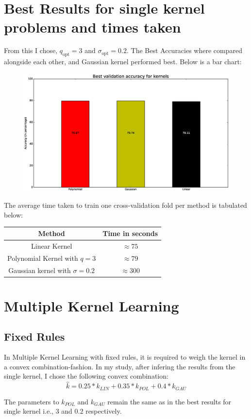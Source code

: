 \documentclass{article}
\begin{document}
\section*{Best Results for single kernel problems and times taken}
\begin{flushleft}
From this I chose, \(q_{\text{opt}} = 3\) and \(\sigma_{\text{opt}} = 0.2\). The Best Accuracies where compared alongside each other, and Gaussian kernel performed best. Below is a bar chart:
\begin{figure}[H]
\centering
\includegraphics[width=0.5\linewidth]{./images/comparison_3.eps}
\end{figure}

The average time taken to train one cross-validation fold per method is tabulated below:

\begin{center}
\begin{tabular}{|c|c|}
\hline
Method & Time in seconds \\
\hline
\hline
Linear Kernel & \(\approx 75\) \\
\hline
Polynomial Kernel with \(q = 3\) & \(\approx 79\) \\
\hline
Gaussian kernel with \(\sigma = 0.2\) & \(\approx 300\) \\
\hline
\end{tabular}
\end{center}
\end{flushleft}

\section*{Multiple Kernel Learning}
\subsection*{Fixed Rules}
\begin{flushleft}
In Multiple Kernel Learning with fixed rules, it is required to weigh the kernel in a convex combination-fashion. In my study, after infering the results from the single kernel, I chose the following convex combination:
\begin{equation*}
\hat{k} = 0.25*k_{LIN} + 0.35*k_{POL} + 0.4*k_{GAU}
\end{equation*}

The parameters to \(k_{POL}\) and \(k_{GAU}\) remain the same as in the best results for single kernel i.e., \(3\) and \(0.2\) respectively.
\end{flushleft}
\end{document}
